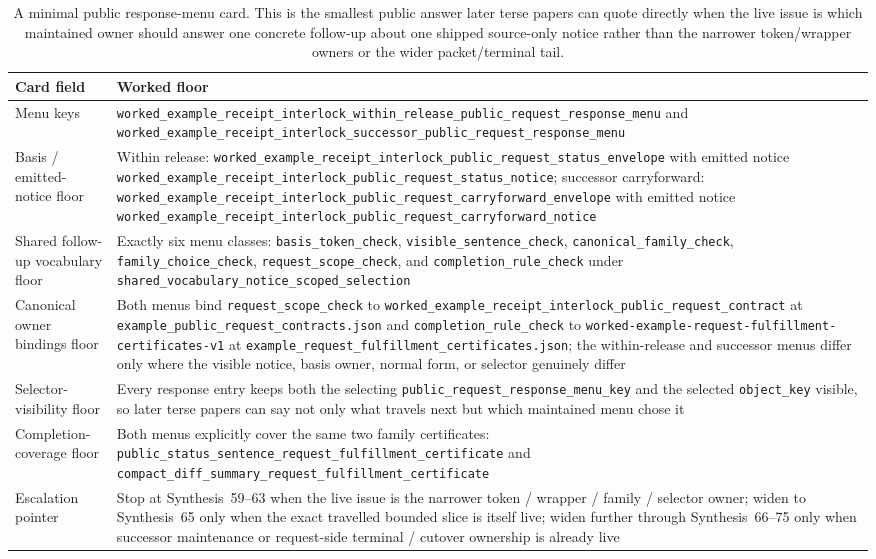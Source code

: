 \documentclass[11pt]{article}
\begin{document}
\begin{table}[t]
\centering
\footnotesize
\begin{tabularx}{\linewidth}{@{}l X@{}}
\toprule
Card field & Worked floor \\
\midrule
Menu keys & \nolinkurl{worked_example_receipt_interlock_within_release_public_request_response_menu} and \nolinkurl{worked_example_receipt_interlock_successor_public_request_response_menu} \\
Basis / emitted-notice floor & Within release: \nolinkurl{worked_example_receipt_interlock_public_request_status_envelope} with emitted notice \nolinkurl{worked_example_receipt_interlock_public_request_status_notice}; successor carryforward: \nolinkurl{worked_example_receipt_interlock_public_request_carryforward_envelope} with emitted notice \nolinkurl{worked_example_receipt_interlock_public_request_carryforward_notice} \\
Shared follow-up vocabulary floor & Exactly six menu classes: \nolinkurl{basis_token_check}, \nolinkurl{visible_sentence_check}, \nolinkurl{canonical_family_check}, \nolinkurl{family_choice_check}, \nolinkurl{request_scope_check}, and \nolinkurl{completion_rule_check} under \nolinkurl{shared_vocabulary_notice_scoped_selection} \\
Canonical owner bindings floor & Both menus bind \nolinkurl{request_scope_check} to \nolinkurl{worked_example_receipt_interlock_public_request_contract} at \nolinkurl{example_public_request_contracts.json} and \nolinkurl{completion_rule_check} to \nolinkurl{worked-example-request-fulfillment-certificates-v1} at \nolinkurl{example_request_fulfillment_certificates.json}; the within-release and successor menus differ only where the visible notice, basis owner, normal form, or selector genuinely differ \\
Selector-visibility floor & Every response entry keeps both the selecting \nolinkurl{public_request_response_menu_key} and the selected \nolinkurl{object_key} visible, so later terse papers can say not only what travels next but which maintained menu chose it \\
Completion-coverage floor & Both menus explicitly cover the same two family certificates: \nolinkurl{public_status_sentence_request_fulfillment_certificate} and \nolinkurl{compact_diff_summary_request_fulfillment_certificate} \\
Escalation pointer & Stop at Synthesis~59--63 when the live issue is the narrower token / wrapper / family / selector owner; widen to Synthesis~65 only when the exact travelled bounded slice is itself live; widen further through Synthesis~66--75 only when successor maintenance or request-side terminal / cutover ownership is already live \\
\bottomrule
\end{tabularx}
\caption{A minimal public response-menu card. This is the smallest public answer later terse papers can quote directly when the live issue is which maintained owner should answer one concrete follow-up about one shipped source-only notice rather than the narrower token/wrapper owners or the wider packet/terminal tail.}
\label{tab:minimal-public-response-menu-card}
\end{table}
\end{document}
